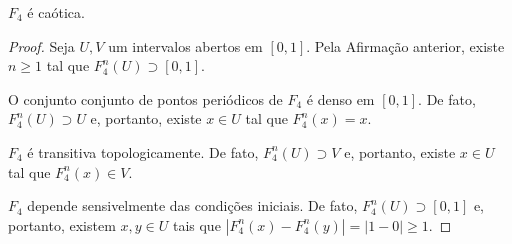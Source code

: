 \begin{affirmation}
$F_4$ é caótica.
\end{affirmation}

\begin{proof}
Seja $U, V$ um intervalos abertos em $[0,1]$. Pela Afirmação anterior, existe $n \geq 1$ tal que $F_4^n(U) \supset [0, 1]$.

O conjunto conjunto de pontos periódicos de $F_4$ é denso em $[0, 1]$. De fato, $F_4^n(U) \supset U$ e, portanto, existe $x \in U$ tal que $F_4^n(x) = x$.

$F_4$ é transitiva topologicamente. De fato, $F_4^n(U) \supset V$ e, portanto, existe $x \in U$ tal que $F_4^n(x) \in V$.

$F_4$ depende sensivelmente das condições iniciais. De fato, $F_4^n(U) \supset [0, 1]$ e, portanto, existem $x, y \in U$ tais que $|F_4^n(x) - F_4^n(y)| = |1 - 0| \geq 1$.
\end{proof}
